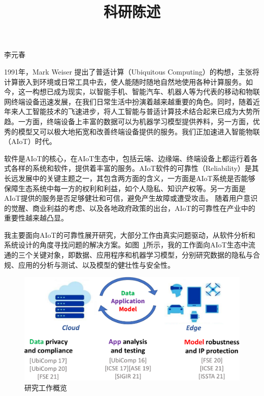 \documentclass[12pt]{article}
\begin{document}

\title{科研陈述}

\maketitle


\begin{center} {李元春} \end{center}



1991年，Mark Weiser 提出了普适计算（Ubiquitous Computing）的构想，主张将计算嵌入到环境或日常工具中去，使人能随时随地自然地使用各种计算服务。如今，这一构想已成为现实，以智能手机、智能汽车、机器人等为代表的移动和物联网终端设备迅速发展，在我们日常生活中扮演着越来越重要的角色。同时，随着近年来人工智能技术的飞速进步，将人工智能与普适计算技术结合起来已成为大势所趋。一方面，终端设备上丰富的数据可以为机器学习模型提供养料，另一方面，优秀的模型又可以极大地拓宽和改善终端设备提供的服务。我们正加速进入智能物联（AIoT）时代。

软件是AIoT的核心，在AIoT生态中，包括云端、边缘端、终端设备上都运行着各式各样的系统和软件，提供着丰富的服务。AIoT软件的可靠性（Reliability）是其长远发展中的关键主题之一，其包含两方面的含义，一方面是AIoT系统是否能够保障生态系统中每一方的权利和利益，如个人隐私、知识产权等。另一方面是AIoT提供的服务是否足够健壮和可信，避免产生故障或遭受攻击。
随着用户意识的觉醒、商业利益的考虑、以及各地政府政策的出台，AIoT的可靠性在产业中的重要性越来越凸显。

我主要面向AIoT的可靠性展开研究，大部分工作由真实问题驱动，从软件分析和系统设计的角度寻找问题的解决方案。如图~\ref{fig:overview}所示，我的工作面向AIoT生态中流通的三个关键对象，即数据、应用程序和机器学习模型，分别研究数据的隐私与合规、应用的分析与测试、以及模型的健壮性与安全性。


\begin{figure}
    \centering
    \includegraphics[width=5in]{figures/research_overview.pdf}
    \caption{研究工作概览}
    \label{fig:overview}
\end{figure}
\end{document}
